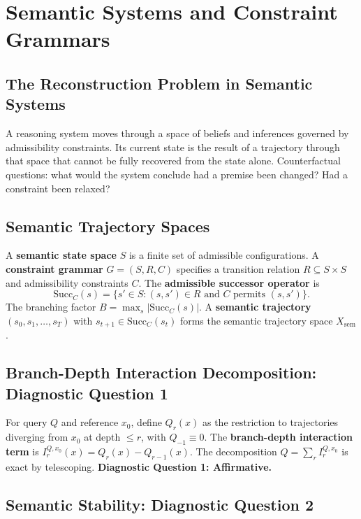 \chapter{Semantic Systems and Constraint Grammars}

\section{The Reconstruction Problem in Semantic Systems}

A reasoning system moves through a space of beliefs and inferences governed by admissibility constraints. Its current state is the result of a trajectory through that space that cannot be fully recovered from the state alone. Counterfactual questions: what would the system conclude had a premise been changed? Had a constraint been relaxed?

\section{Semantic Trajectory Spaces}

A \textbf{semantic state space} $S$ is a finite set of admissible configurations. A \textbf{constraint grammar} $G = (S, R, C)$ specifies a transition relation $R \subseteq S \times S$ and admissibility constraints $C$. The \textbf{admissible successor operator} is
\[
  \mathrm{Succ}_C(s) = \{s' \in S : (s, s') \in R \text{ and } C \text{ permits } (s,s')\}.
\]
The branching factor $B = \max_{s} |\mathrm{Succ}_C(s)|$. A \textbf{semantic trajectory} $(s_0, s_1, \ldots, s_T)$ with $s_{t+1} \in \mathrm{Succ}_C(s_t)$ forms the semantic trajectory space $X_{\mathrm{sem}}$.

\section{Branch-Depth Interaction Decomposition: Diagnostic Question 1}

For query $Q$ and reference $x_0$, define $Q_r(x)$ as the restriction to trajectories diverging from $x_0$ at depth $\leq r$, with $Q_{-1} \equiv 0$. The \textbf{branch-depth interaction term} is $I_r^{Q,x_0}(x) = Q_r(x) - Q_{r-1}(x)$. The decomposition $Q = \sum_r I_r^{Q,x_0}$ is exact by telescoping. \textbf{Diagnostic Question 1: Affirmative.}

\section{Semantic Stability: Diagnostic Question 2}

